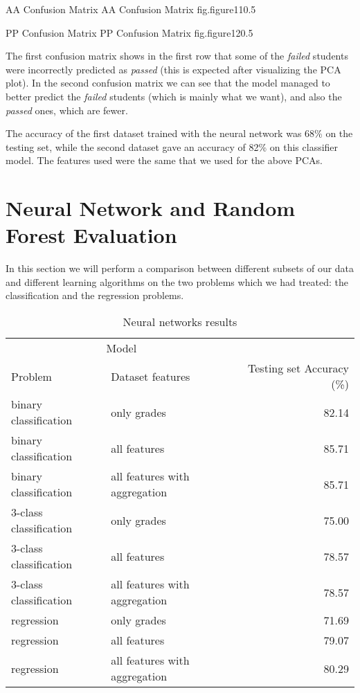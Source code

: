 %
    {AA Confusion Matrix}%
    {AA Confusion Matrix}%
    {fig.figure11}{0.5}

%
    {PP Confusion Matrix}%
    {PP Confusion Matrix}%
    {fig.figure12}{0.5}

The first confusion matrix shows in the first row that some of the {\it failed} 
students were incorrectly predicted as {\it passed} (this is expected after visualizing 
the PCA plot). In the second confusion matrix we can see that the model managed 
to better predict the {\it failed} students (which is mainly what we want), and also 
the {\it passed} ones, which are fewer. 

The accuracy of the first dataset trained with the neural network was 68\% on the 
testing set, while the second dataset gave an accuracy of 82\% on this classifier 
model. The features used were the same that we used for the above PCAs.

\section{Neural Network and Random Forest Evaluation}

In this section we will perform a comparison between different subsets of our 
data and different learning algorithms on the two problems which we had treated: the 
classification and the regression problems. 

\begin{table}[ht]
\centering
\begin{tabular}{llr}  
\toprule
\multicolumn{2}{c}{Model} \\
\cmidrule(r){1-2}
Problem                    & Dataset features               & Testing set Accuracy (\%) \\
\midrule
binary classification      & only grades                    & 82.14      \\
binary classification      & all features                   & 85.71      \\
binary classification      & all features with aggregation  & 85.71      \\
3-class classification     & only grades                    & 75.00      \\
3-class classification     & all features                   & 78.57      \\
3-class classification     & all features with aggregation  & 78.57      \\
regression                 & only grades                    & 71.69      \\
regression                 & all features                   & 79.07      \\
regression                 & all features with aggregation  & 80.29      \\
\bottomrule
\end{tabular}
\caption[Neural networks results]{Neural networks results}
\label{table_nn_test}
\end{table}


